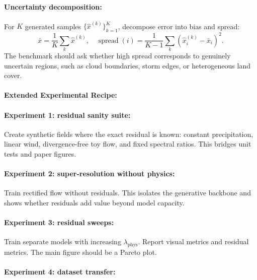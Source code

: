 \documentclass{article}
\begin{document}
\paragraph{Uncertainty decomposition:}

For $K$ generated samples $\{\hat{x}^{(k)}\}_{k=1}^{K}$, decompose error into bias and spread:
\begin{equation}
  \bar{x}=\frac{1}{K}\sum_k\hat{x}^{(k)},\quad
  \operatorname{spread}(i)=\frac{1}{K-1}\sum_k(\hat{x}_i^{(k)}-\bar{x}_i)^2.
\end{equation}
The benchmark should ask whether high spread corresponds to genuinely uncertain regions, such as cloud boundaries, storm edges, or heterogeneous land cover.

\paragraph{Extended Experimental Recipe:}

\paragraph{Experiment 1: residual sanity suite:}

Create synthetic fields where the exact residual is known: constant precipitation, linear wind, divergence-free toy flow, and fixed spectral ratios. This bridges unit tests and paper figures.

\paragraph{Experiment 2: super-resolution without physics:}

Train rectified flow without residuals. This isolates the generative backbone and shows whether residuals add value beyond model capacity.

\paragraph{Experiment 3: residual sweeps:}

Train separate models with increasing $\lambda_{\text{phys}}$. Report visual metrics and residual metrics. The main figure should be a Pareto plot.

\paragraph{Experiment 4: dataset transfer:}
\end{document}
